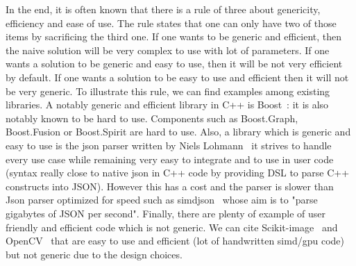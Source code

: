 
In the end, it is often known that there is a rule of three about genericity, efficiency and ease of use. The rule
states that one can only have two of those items by sacrificing the third one. If one wants to be generic and efficient,
then the naive solution will be very complex to use with lot of parameters. If one wants a solution to be generic and
easy to use, then it will be not very efficient by default. If one wants a solution to be easy to use and efficient then
it will not be very generic. To illustrate this rule, we can find examples among existing libraries. A notably generic
and efficient library in C++ is Boost~\parencite{boost.2021}: it is also notably known to be hard to use. Components
such as Boost.Graph, Boost.Fusion or Boost.Spirit are hard to use. Also, a library which is generic and easy to use is
the json parser written by Niels Lohmann~\parencite{nlohmann.2021.json} it strives to handle every use case while
remaining very easy to integrate and to use in user code (syntax really close to native json in C++ code by providing
DSL to parse C++ constructs into JSON). However this has a cost and the parser is slower than Json parser optimized for
speed such as simdjson~\parencite{lemire.2021.simdjson} whose aim is to "parse gigabytes of JSON per second". Finally,
there are plenty of example of user friendly and efficient code which is not generic. We can cite
Scikit-image~\parencite{vanderwalt.2014.skimage} and OpenCV~\parencite{bradski.2000.opencv} that are easy to use and
efficient (lot of handwritten simd/gpu code) but not generic due to the design choices.

